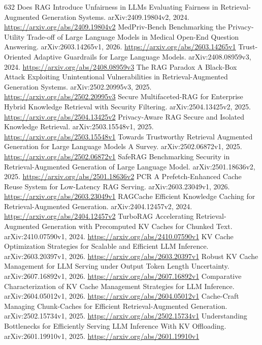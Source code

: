 \documentclass[11pt]{article}
\begin{document}
\begin{thebibliography}{632}
 Does RAG Introduce Unfairness in LLMs Evaluating Fairness in Retrieval-Augmented Generation Systems. arXiv:2409.19804v2, 2024. \url{https://arxiv.org/abs/2409.19804v2}
 MedPriv-Bench Benchmarking the Privacy-Utility Trade-off of Large Language Models in Medical Open-End Question Answering. arXiv:2603.14265v1, 2026. \url{https://arxiv.org/abs/2603.14265v1}
 Trust-Oriented Adaptive Guardrails for Large Language Models. arXiv:2408.08959v3, 2024. \url{https://arxiv.org/abs/2408.08959v3}
 The RAG Paradox A Black-Box Attack Exploiting Unintentional Vulnerabilities in Retrieval-Augmented Generation Systems. arXiv:2502.20995v3, 2025. \url{https://arxiv.org/abs/2502.20995v3}
 Secure Multifaceted-RAG for Enterprise Hybrid Knowledge Retrieval with Security Filtering. arXiv:2504.13425v2, 2025. \url{https://arxiv.org/abs/2504.13425v2}
 Privacy-Aware RAG Secure and Isolated Knowledge Retrieval. arXiv:2503.15548v1, 2025. \url{https://arxiv.org/abs/2503.15548v1}
 Towards Trustworthy Retrieval Augmented Generation for Large Language Models A Survey. arXiv:2502.06872v1, 2025. \url{https://arxiv.org/abs/2502.06872v1}
 SafeRAG Benchmarking Security in Retrieval-Augmented Generation of Large Language Model. arXiv:2501.18636v2, 2025. \url{https://arxiv.org/abs/2501.18636v2}
 PCR A Prefetch-Enhanced Cache Reuse System for Low-Latency RAG Serving. arXiv:2603.23049v1, 2026. \url{https://arxiv.org/abs/2603.23049v1}
 RAGCache Efficient Knowledge Caching for Retrieval-Augmented Generation. arXiv:2404.12457v2, 2024. \url{https://arxiv.org/abs/2404.12457v2}
 TurboRAG Accelerating Retrieval-Augmented Generation with Precomputed KV Caches for Chunked Text. arXiv:2410.07590v1, 2024. \url{https://arxiv.org/abs/2410.07590v1}
 KV Cache Optimization Strategies for Scalable and Efficient LLM Inference. arXiv:2603.20397v1, 2026. \url{https://arxiv.org/abs/2603.20397v1}
 Robust KV Cache Management for LLM Serving under Output Token Length Uncertainty. arXiv:2607.16892v1, 2026. \url{https://arxiv.org/abs/2607.16892v1}
 Comparative Characterization of KV Cache Management Strategies for LLM Inference. arXiv:2604.05012v1, 2026. \url{https://arxiv.org/abs/2604.05012v1}
 Cache-Craft Managing Chunk-Caches for Efficient Retrieval-Augmented Generation. arXiv:2502.15734v1, 2025. \url{https://arxiv.org/abs/2502.15734v1}
 Understanding Bottlenecks for Efficiently Serving LLM Inference With KV Offloading. arXiv:2601.19910v1, 2025. \url{https://arxiv.org/abs/2601.19910v1}

\end{thebibliography}
\end{document}
